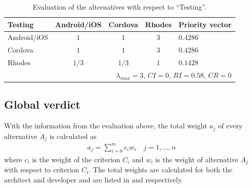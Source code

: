 \begin{table}[h!]
    \begin{center}
        \begin{tabular}{lcccl}
            \hline
            \textbf{Testing} & Android/iOS & Cordova & Rhodes & Priority vector \\
            \hline
            Android/iOS      & $1$         & $1$     & $3$    & $0.4286$ \\
            Cordova          & $1$         & $1$     & $3$    & $0.4286$ \\
            Rhodes           & $1/3$       & $1/3$   & $1$    & $0.1428$ \\
            \hline
            \multicolumn{5}{r}{$\lambda_{max} = 3$, $CI = 0$, $RI = 0.58$, $CR = 0$}\\
            \hline
        \end{tabular}
        \caption{Evaluation of the alternatives with respect to ``Testing''.}
        \label{tab:testing}
    \end{center}
\end{table}

\subsection*{Global verdict}

With the information from the evaluation above, the total weight $a_j$ of every alternative $A_j$ is calculated as
\begin{gather*}
    a_j = \sum_{i = 0}^{m} c_i w_i \quad j = 1, \ldots, n
\end{gather*}
where $c_i$ is the weight of the criterion $C_i$ and $w_i$ is the weight of alternative $A_j$ with respect to criterion $C_i$. The total weights are calculated for both the architect and developer and are listed in  and  respectively. 

